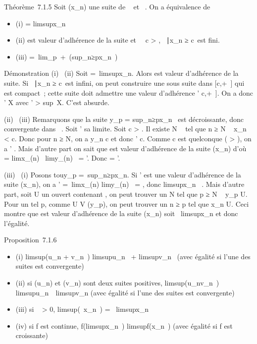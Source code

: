 \documentclass[]{article}
\begin{document}
Théorème~7.1.5 Soit (x\_n) une suite de
\overline{}~ et \ell \in\overline{}~. On a
équivalence de

\begin{itemize}
\itemsep1pt\parskip0pt
\item
  (i) \ell = limsupx\_n~
\item
  (ii) \ell est valeur d'adhérence de la suite et
  \forall~~c \textgreater{} \ell, \n \in
  ~∣x\_n ≥ c\ est
  fini.
\item
  (iii) \ell =\
  lim\_p\rightarrow~+\infty~(sup\_n≥px\_n~)
\end{itemize}

Démonstration (i) \rigtharrow~(ii) Soit \ell =\
limsupx\_n. Alors \ell est valeur d'adhérence de la suite. Si
\n \in \mathbb{N}~∣x\_n ≥
c\ est infini, on peut construire une sous suite dans
{[}c,+\infty~{]} qui est compact~; cette suite doit admettre une valeur
d'adhérence \ell' \in {[}c,+\infty~{]}. On a donc \ell' \in X avec \ell'
\textgreater{} sup~X. C'est absurde.

(ii) \rigtharrow~(iii) Remarquons que la suite y\_p
= sup\_n≥px\_n~ est
décroissante, donc convergente dans \overline{}~. Soit
\ell' sa limite. Soit c \textgreater{} \ell. Il existe N \in {}~ tel que n ≥ N \rigtharrow~
x\_n \textless{} c. Donc pour n ≥ N, on a y\_n \leq c et
donc \ell' \leq c. Comme c est quelconque ( \textgreater{} \ell), on a \ell' \leq \ell.
Mais d'autre part on sait que \ell est valeur d'adhérence de la suite
(x\_n) d'où \ell = limx\_\phi(n)~
\leq limy\_\phi(n)~ = \ell'. Donc \ell = \ell'.

(iii) \rigtharrow~(i) Posons tou\jmathours y\_p =\
sup\_n≥px\_n. Si \ell' est une valeur d'adhérence de la
suite (x\_n), on a \ell' =\
limx\_\phi(n) \leq limy\_\phi(n)~ = \ell,
donc limsupx\_n~ \leq \ell. Mais d'autre
part, soit U un ouvert contenant \ell, on peut trouver un N tel que p ≥ N \rigtharrow~
y\_p \in U. Pour un tel p, comme U \in V (y\_p), on peut
trouver un n ≥ p tel que x\_n \in U. Ceci montre que \ell est valeur
d'adhérence de la suite (x\_n) soit \ell \leq\
limsupx\_n et donc l'égalité.

Proposition~7.1.6

\begin{itemize}
\itemsep1pt\parskip0pt
\item
  (i) limsup(u\_n + v\_n~)
  \leq limsupu\_n~
  + limsupv\_n~ (avec égalité si l'une
  des suites est convergente)
\item
  (ii) si (u\_n) et (v\_n) sont deux suites positives,
  limsup(u\_nv\_n~)
  \leq limsupu\_n~\
  limsupv\_n (avec égalité si l'une des suites est
  convergente)
\item
  (iii) si \lambda~ \textgreater{} 0,
  limsup(\lambda~x\_n~) =
  \lambda~limsupx\_n~
\item
  (iv) si f est continue,
  f(limsupx\_n~)
  \leq limsupf(x\_n~) (avec égalité si f
  est croissante)
\end{itemize}
\end{document}
